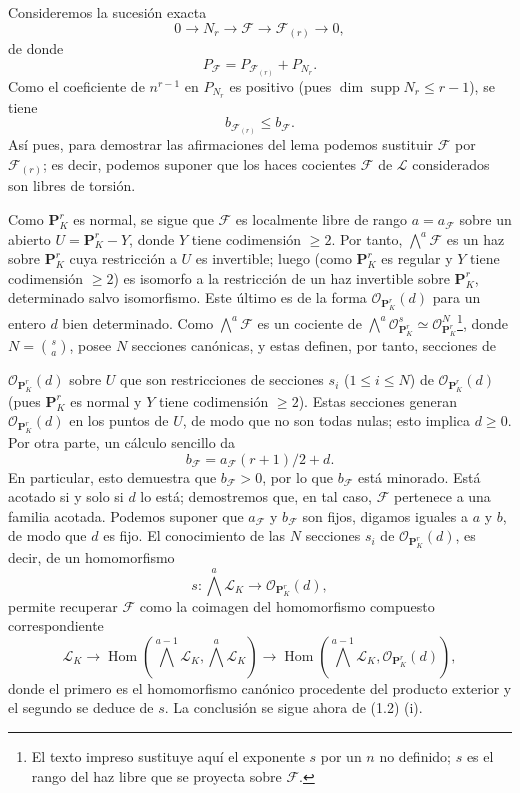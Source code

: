 \documentclass[11pt,twoside,openany]{book}
\numberwithin{equation}{section}
\newcommand{\src}[1]{%
  \phantomsection\hypertarget{src:#1}{}%
  \marginpar{\raggedleft\footnotesize\sffamily #1}%
}
\theoremstyle{plain}
\theoremstyle{definition}
\theoremstyle{remark}
\newcommand{\FgaUnitKey}{frontmatter}
\renewcommand{\src}[1]{%
  \phantomsection\hypertarget{src:\FgaUnitKey:#1}{}%
  \marginpar{\raggedleft\footnotesize\sffamily #1}%
}
\theoremstyle{plain}
\theoremstyle{definition}
\theoremstyle{remark}
\begin{document}
Consideremos la sucesión exacta
\[
0\longrightarrow N_r\longrightarrow\mathcal F
\longrightarrow\mathcal F_{(r)}\longrightarrow0,
\]
de donde
\[
P_{\mathcal F}=P_{\mathcal F_{(r)}}+P_{N_r}.
\]
Como el coeficiente de $n^{r-1}$ en $P_{N_r}$ es positivo (pues
$\dim\operatorname{supp}N_r\leq r-1$), se tiene
\[
b_{\mathcal F_{(r)}}\leq b_{\mathcal F}.
\]
Así pues, para demostrar las afirmaciones del lema podemos sustituir
$\mathcal F$ por $\mathcal F_{(r)}$; es decir, podemos suponer que los haces
cocientes $\mathcal F$ de $\mathcal L$ considerados son libres de torsión.

Como $\mathbf P^r_K$ es normal, se sigue que $\mathcal F$ es localmente libre
de rango $a=a_{\mathcal F}$ sobre un abierto $U=\mathbf P^r_K-Y$, donde $Y$
tiene codimensión $\geq2$. Por tanto, $\bigwedge^a\mathcal F$ es un haz sobre
$\mathbf P^r_K$ cuya restricción a $U$ es invertible; luego (como
$\mathbf P^r_K$ es regular y $Y$ tiene codimensión $\geq2$) es isomorfo a la
restricción de un haz invertible sobre $\mathbf P^r_K$, determinado salvo
isomorfismo. Este último es de la forma $\mathcal O_{\mathbf P^r_K}(d)$ para
un entero $d$ bien determinado. Como $\bigwedge^a\mathcal F$ es un cociente
de $\bigwedge^a\mathcal O_{\mathbf P^r_K}^{s}\simeq
\mathcal O_{\mathbf P^r_K}^{N}$\footnote{El texto impreso sustituye aquí el
exponente $s$ por un $n$ no definido; $s$ es el rango del haz libre que se
proyecta sobre $\mathcal F$.}, donde $N=\binom{s}{a}$, posee $N$ secciones
canónicas, y estas definen, por tanto, secciones de
\src{257}
$\mathcal O_{\mathbf P^r_K}(d)$ sobre $U$ que son restricciones de secciones
$s_i$ ($1\leq i\leq N$) de $\mathcal O_{\mathbf P^r_K}(d)$ (pues
$\mathbf P^r_K$ es normal y $Y$ tiene codimensión $\geq2$). Estas secciones
generan $\mathcal O_{\mathbf P^r_K}(d)$ en los puntos de $U$, de modo que no
son todas nulas; esto implica $d\geq0$. Por otra parte, un cálculo sencillo da
\[
b_{\mathcal F}=a_{\mathcal F}(r+1)/2+d.
\]
En particular, esto demuestra que $b_{\mathcal F}>0$, por lo que
$b_{\mathcal F}$ está minorado. Está acotado si y solo si $d$ lo está;
demostremos que, en tal caso, $\mathcal F$ pertenece a una familia acotada.
Podemos suponer que $a_{\mathcal F}$ y $b_{\mathcal F}$ son fijos, digamos
iguales a $a$ y $b$, de modo que $d$ es fijo. El conocimiento de las $N$
secciones $s_i$ de $\mathcal O_{\mathbf P^r_K}(d)$, es decir, de un
homomorfismo
\[
s:\bigwedge^a\mathcal L_K\longrightarrow\mathcal O_{\mathbf P^r_K}(d),
\]
permite recuperar $\mathcal F$ como la coimagen del homomorfismo compuesto
correspondiente
\[
\mathcal L_K\longrightarrow
\operatorname{Hom}\!\left(\bigwedge^{a-1}\mathcal L_K,
\bigwedge^a\mathcal L_K\right)\longrightarrow
\operatorname{Hom}\!\left(\bigwedge^{a-1}\mathcal L_K,
\mathcal O_{\mathbf P^r_K}(d)\right),
\]
donde el primero es el homomorfismo canónico procedente del producto exterior
y el segundo se deduce de $s$. La conclusión se sigue ahora de (1.2) (i).
\end{document}
